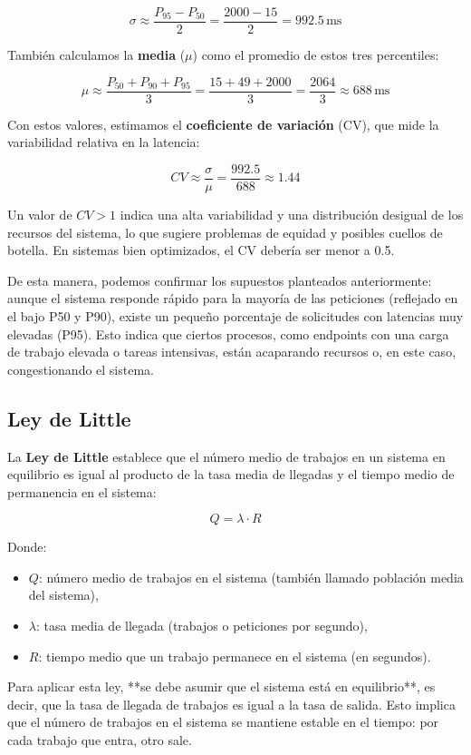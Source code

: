 \documentclass[10pt]{book}
\begin{document}
\[
\sigma \approx \frac{P_{95} - P_{50}}{2} = \frac{2000 - 15}{2} = 992.5 \, \text{ms}
\]

También calculamos la \textbf{media} (\(\mu\)) como el promedio de estos tres percentiles:

\[
\mu \approx \frac{P_{50} + P_{90} + P_{95}}{3} = \frac{15 + 49 + 2000}{3} = \frac{2064}{3} \approx 688 \, \text{ms}
\]

Con estos valores, estimamos el \textbf{coeficiente de variación} (CV), que mide la variabilidad relativa en la latencia:

\[
CV \approx \frac{\sigma}{\mu} = \frac{992.5}{688} \approx 1.44
\]

Un valor de \( CV > 1 \) indica una alta variabilidad y una distribución desigual de los recursos del sistema, lo que sugiere problemas de equidad y posibles cuellos de botella. En sistemas bien optimizados, el CV debería ser menor a 0.5.

De esta manera, podemos confirmar los supuestos planteados anteriormente: aunque el sistema responde rápido para la mayoría de las peticiones (reflejado en el bajo P50 y P90), existe un pequeño porcentaje de solicitudes con latencias muy elevadas (P95). Esto indica que ciertos procesos, como endpoints con una carga de trabajo elevada o tareas intensivas, están acaparando recursos o, en este caso, congestionando el sistema.

\subsection{Ley de Little}

La \textbf{Ley de Little} establece que el número medio de trabajos en un sistema en equilibrio es igual al producto de la tasa media de llegadas y el tiempo medio de permanencia en el sistema:

\[
Q = \lambda \cdot R
\]

Donde:

\begin{itemize}
    \item \( Q \): número medio de trabajos en el sistema (también llamado población media del sistema),
    \item \( \lambda \): tasa media de llegada (trabajos o peticiones por segundo),
    \item \( R \): tiempo medio que un trabajo permanece en el sistema (en segundos).
\end{itemize}

Para aplicar esta ley, **se debe asumir que el sistema está en equilibrio**, es decir, que la tasa de llegada de trabajos es igual a la tasa de salida. Esto implica que el número de trabajos en el sistema se mantiene estable en el tiempo: por cada trabajo que entra, otro sale.
\end{document}
